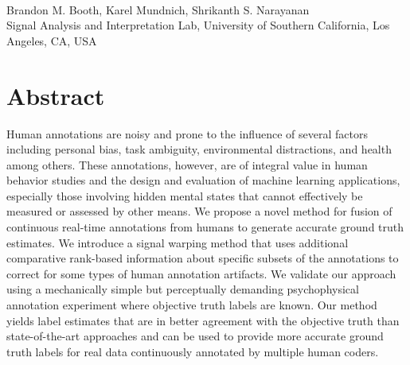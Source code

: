 \documentclass[10pt,letterpaper]{article}
\date{}
\begin{document}
\vspace*{0.2in}

\begin{flushleft}
{\Large
\textbf{} %
}
\newline
\\
Brandon M. Booth,
Karel Mundnich,
Shrikanth S. Narayanan
\\
\bigskip
Signal Analysis and Interpretation Lab, University of Southern California, Los Angeles, CA, USA
\\
\bigskip
\end{flushleft}


\section*{Abstract}
Human annotations are noisy and prone to the influence of several factors including personal bias, task ambiguity, environmental distractions, and health among others.  These annotations, however, are of integral value in human behavior studies and the design and evaluation of machine learning applications, especially those involving hidden mental states that cannot effectively be measured or assessed by other means.  We propose a novel method for fusion of continuous real-time annotations from humans to generate accurate ground truth estimates.  We introduce a signal warping method that uses additional comparative rank-based information about specific subsets of the annotations to correct for some types of human annotation artifacts.  We validate our approach using a mechanically simple but perceptually demanding psychophysical annotation experiment where objective truth labels are known.  Our method yields label estimates that are in better agreement with the objective truth than state-of-the-art approaches and can be used to provide more accurate ground truth labels for real data continuously annotated by multiple human coders.

\linenumbers
\end{document}
